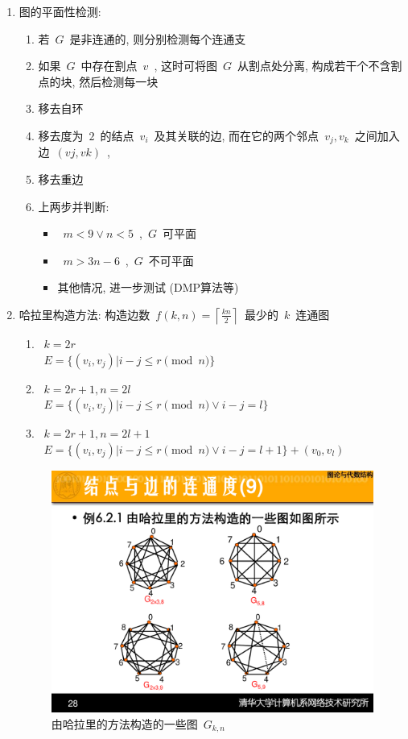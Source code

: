 \documentclass[11pt,a4paper]{article}%
\renewcommand{\[}{~$}
\renewcommand{\]}{$~}%
\begin{document}
\begin{enumerate}
\begin{lstlisting}[mathescape,frame=shadowbox, caption=Prim~算法]
	$U = U + u$
	for $v\in V-U$
		$w(t,v) = \min\{w(t,v),w(u,v)\}$
	 	\end{lstlisting}
	 \item 图的平面性检测: 
	 	\begin{enumerate}
	 	 \item 若\[G\]是非连通的, 则分别检测每个连通支
	 	 \item 如果\[G\]中存在割点\[v\], 这时可将图\[G\]从割点处分离, 构成若干个不含割点的块, 然后检测每一块
	 	 \item 移去自环
	 	 \item 移去度为\[2\]的结点\[v_i\]及其关联的边, 而在它的两个邻点\[v_j,v_k\]之间加入边\[(vj,vk)\], 
	 	 \item 移去重边
	 	 \item 上两步并判断: 
	 	 	\begin{itemize}
	 	 	 \item \[m < 9 \lor n < 5\],\[G\]可平面
	 	 	 \item \[m > 3n-6\],\[G\]不可平面
	 	 	 \item 其他情况, 进一步测试 (DMP算法等)
	 	 	\end{itemize}
	 	\end{enumerate}
	 \item 哈拉里构造方法: 构造边数\[f(k,n) = \left\lceil\frac{kn}{2}\right\rceil\]最少的\[k\]连通图
	 	\begin{enumerate}
	 	 \item \[k=2r\]\\
	 	 	\[E = \{(v_i, v_j)|i-j\le r \pmod n\}\]
	 	 \item \[k=2r+1, n=2l\]\\
	 	 	\[E = \{(v_i, v_j)|i-j\le r \pmod n\lor i-j=l\}\]
	 	 \item \[k=2r+1, n=2l+1\]\\
	 	 	\[E = \{(v_i, v_j)|i-j\le r \pmod n\lor i-j=l+1\} + (v_0,v_l)\]
	 	\end{enumerate}
	 	\begin{figure}[!ht]
	 	 \centering
	 	 \includegraphics[width = 0.9\linewidth]{maxbian.pdf}
	 	 \caption{由哈拉里的方法构造的一些图\[G_{k,n}\]}
	 	\end{figure}
	\end{enumerate}
\end{document}
